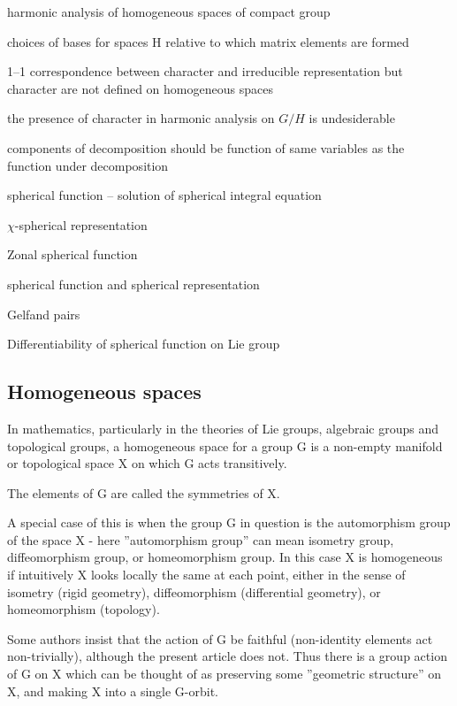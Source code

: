 \documentclass[oneside,12pt]{memoir}
\begin{document}
\begin{itemize*}
\item harmonic analysis of homogeneous spaces of compact group
\item choices of bases for spaces H relative to which matrix elements are formed
\item 1--1 correspondence between character and irreducible representation but character are not defined on homogeneous spaces
\item the presence of character in harmonic analysis on $G/H$ is undesiderable
\item components of decomposition should be function of same variables as the function under decomposition
\item spherical function -- solution of spherical integral equation
\item $\chi$-spherical representation
\item Zonal spherical function
\item spherical function and spherical representation
\item Gelfand pairs
\item Differentiability of spherical function on Lie group
\end{itemize*}

\subsection{Homogeneous spaces}
In mathematics, particularly in the theories of Lie groups, algebraic groups and topological groups, a homogeneous space for a group G is a non-empty manifold or topological space X on which G acts transitively.

The elements of G are called the symmetries of X.

A special case of this is when the group G in question is the automorphism group of the space X - here ''automorphism group'' can mean isometry group, diffeomorphism group, or homeomorphism group. In this case X is homogeneous if intuitively X looks locally the same at each point, either in the sense of isometry (rigid geometry), diffeomorphism (differential geometry), or homeomorphism (topology). 

Some authors insist that the action of G be faithful (non-identity elements act non-trivially), although the present article does not. Thus there is a group action of G on X which can be thought of as preserving some ''geometric structure'' on X, and making X into a single G-orbit.
\end{document}
